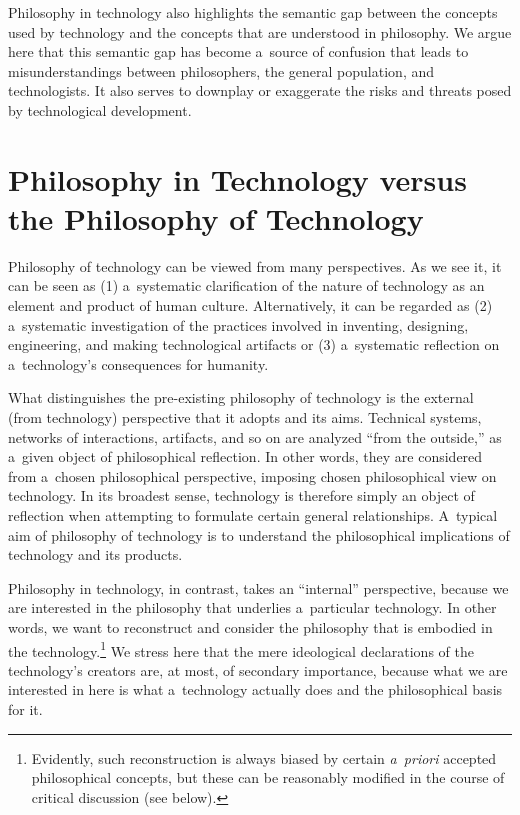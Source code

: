 Philosophy in technology also highlights the semantic gap between the concepts used by technology and the concepts that are understood in philosophy. We argue here that this semantic gap has become a~source of confusion that leads to misunderstandings between philosophers, the general population, and technologists. It also serves to downplay or exaggerate the risks and threats posed by technological development.



\section{Philosophy in Technology versus the Philosophy of Technology}

Philosophy of technology can be viewed from many perspectives. As we see it, it can be seen as (1) a~systematic clarification of the nature of technology as an element and product of human culture. Alternatively, it can be regarded as (2) a~systematic investigation of the practices involved in inventing, designing, engineering, and making technological artifacts or (3) a~systematic reflection on a~technology's consequences for humanity.



What distinguishes the pre-existing philosophy of technology is the external (from technology) perspective that it adopts and its aims. Technical systems, networks of interactions, artifacts, and so on are analyzed ``from the outside,'' as a~given object of philosophical reflection. In other words, they are considered from a~chosen philosophical perspective, imposing chosen philosophical view on technology. In its broadest sense, technology is therefore simply an object of reflection when attempting to formulate certain general relationships. A~typical aim of philosophy of technology is to understand the philosophical implications of technology and its products.



Philosophy in technology, in contrast, takes an ``internal'' perspective, because we are interested in the philosophy that underlies a~particular technology. In other words, we want to reconstruct and consider the philosophy that is embodied in the technology.\footnote{\textrm{Evidently, such reconstruction is always biased by certain }\textrm{\textit{a~priori}}\textrm{ accepted philosophical concepts, but these can be reasonably modified in the course of critical discussion (see below).}} We stress here that the mere ideological declarations of the technology's creators are, at most, of secondary importance, because what we are interested in here is what a~technology actually does and the philosophical basis for it.



